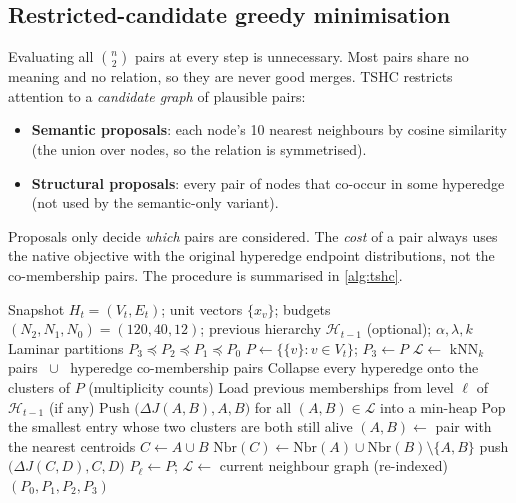 \documentclass[11pt,a4paper]{article}
\newcommand{\cref}[1]{\autoref{#1}}
\theoremstyle{remark}
\begin{document}
\subsection{Restricted-candidate greedy minimisation}

Evaluating all $\binom{n}{2}$ pairs at every step is unnecessary. Most pairs share no
meaning and no relation, so they are never good merges. TSHC restricts attention to a
\emph{candidate graph} of plausible pairs:

\begin{itemize}
  \item \textbf{Semantic proposals}: each node's 10 nearest neighbours by cosine
        similarity (the union over nodes, so the relation is symmetrised).
  \item \textbf{Structural proposals}: every pair of nodes that co-occur in some
        hyperedge (not used by the semantic-only variant).
\end{itemize}

Proposals only decide \emph{which} pairs are considered. The \emph{cost} of a pair
always uses the native objective with the original hyperedge endpoint distributions,
not the co-membership pairs. The procedure is summarised in \cref{alg:tshc}.

\begin{algorithm}[!htbp]
\caption{TSHC hierarchy construction for one snapshot}
\label{alg:tshc}
\begin{algorithmic}[1]
\Require Snapshot $H_t=(V_t,E_t)$; unit vectors $\{x_v\}$; budgets $(N_2,N_1,N_0)=(120,40,12)$; previous hierarchy $\mathcal H_{t-1}$ (optional); $\alpha,\lambda,k$
\Ensure Laminar partitions $P_3\preceq P_2\preceq P_1\preceq P_0$
\State $P\gets\{\{v\}:v\in V_t\}$; \quad $P_3\gets P$
\State $\mathcal L\gets$ kNN$_k$ pairs $\;\cup\;$ hyperedge co-membership pairs 
  \State Collapse every hyperedge onto the clusters of $P$ (multiplicity counts)
  \State Load previous memberships from level $\ell$ of $\mathcal H_{t-1}$ (if any)
  \State Push $\big(\Delta J(A,B),A,B\big)$ for all $(A,B)\in\mathcal L$ into a min-heap
    \State Pop the smallest entry whose two clusters are both still alive
       \State $(A,B)\gets$ pair with the nearest centroids 
    \EndIf
    \State $C\gets A\cup B$ 
    \State $\mathrm{Nbr}(C)\gets\mathrm{Nbr}(A)\cup\mathrm{Nbr}(B)\setminus\{A,B\}$
     push $\big(\Delta J(C,D),C,D\big)$ \EndFor
  \EndWhile
  \State $P_\ell\gets P$; \quad $\mathcal L\gets$ current neighbour graph (re-indexed)
\EndFor
\State \Return $(P_0,P_1,P_2,P_3)$
\end{algorithmic}
\end{algorithm}
\end{document}
